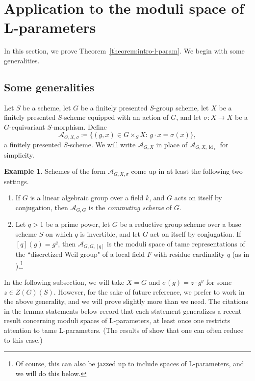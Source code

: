 \documentclass[11pt,reqno]{amsart}
\theoremstyle{definition}
\newtheorem{example}[theorem]{Example}
\newcommand{\sA}{{\mathscr A}}
\DeclareMathOperator{\id}{id}
\begin{document}
\section{Application to the moduli space of L-parameters}\label{section:moduli}

In this section, we prove Theorem~\ref{theorem:intro-l-param}. We begin with some generalities.

\subsection{Some generalities}

Let $S$ be a scheme, let $G$ be a finitely presented $S$-group scheme, let $X$ be a finitely presented $S$-scheme equipped with an action of $G$, and let $\sigma\colon X \to X$ be a $G$-equivariant $S$-morphism. Define
\[
\sA_{G, X, \sigma}\coloneqq \{(g, x) \in G \times_S X\colon\, g \cdot x = \sigma(x)\},
\]
a finitely presented $S$-scheme. We will write $\sA_{G, X}$ in place of $\sA_{G, X, \id_X}$ for simplicity.

\begin{example}
    Schemes of the form $\sA_{G, X, \sigma}$ come up in at least the following two settings.
    \begin{enumerate}
        \item If $G$ is a linear algebraic group over a field $k$, and $G$ acts on itself by conjugation, then $\sA_{G, G}$ is the \textit{commuting scheme} of $G$.
        \item Let $q > 1$ be a prime power, let $G$ be a reductive group scheme over a base scheme $S$ on which $q$ is invertible, and let $G$ act on itself by conjugation. If $[q](g) = g^q$, then $\sA_{G, G, [q]}$ is the moduli space of tame representations of the ``discretized Weil group" of a local field $F$ with residue cardinality $q$ (as in \cite{DHKM}).\footnote{Of course, this can also be jazzed up to include spaces of L-parameters, and we will do this below.}
    \end{enumerate}
\end{example}

In the following subsection, we will take $X = G$ and $\sigma(g) = z \cdot g^q$ for some $z \in Z(G)(S)$. However, for the sake of future reference, we prefer to work in the above generality, and we will prove slightly more than we need. The citations in the lemma statements below record that each statement generalizes a recent result concerning moduli spaces of L-parameters, at least once one restricts attention to tame L-parameters. (The results of \cite[\S 4.1]{DHKM} show that one can often reduce to this case.)
\end{document}
